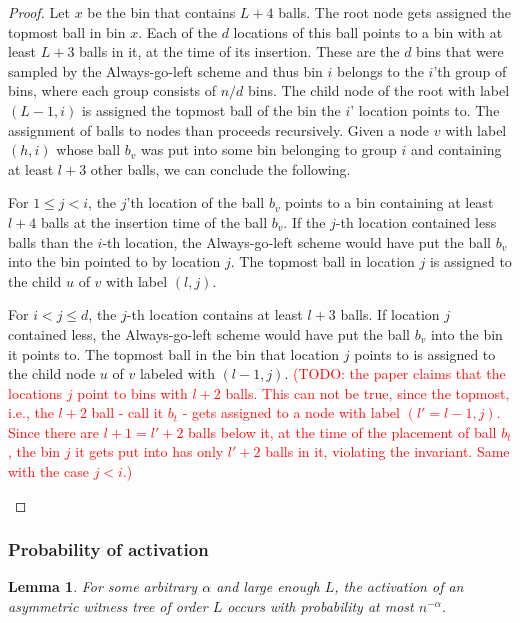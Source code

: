 \documentclass[a4paper,12pt]{article}
\newcommand\todo[1]{\textcolor{red}{(TODO: #1)}}
\newtheorem{lemma}{Lemma}
\begin{document}
\begin{proof}
Let $x$ be the bin that contains $L+4$ balls. The root node gets assigned the topmost ball in bin $x$. Each of the $d$ locations of this ball points to a bin with at least $L+3$ balls in it, at the time of its insertion. These are the $d$ bins that were sampled by the Always-go-left scheme and thus bin $i$ belongs to the $i$'th group of bins, where each group consists of $n/d$ bins. The child node of the root with label $(L-1, i)$ is assigned the topmost ball of the bin the $i$' location points to. The assignment of balls to nodes than proceeds recursively. Given a node $v$ with label $(h, i)$ whose ball $b_v$ was put into some bin belonging to group $i$ and containing at least $l+3$ other balls, we can conclude the following.
\begin{compactitem}
\item For $1\leq j < i$, the $j$'th location of the ball $b_v$ points to a bin containing at least $l+4$ balls at the insertion time of the ball $b_v$. If the $j$-th location contained less balls than the $i$-th location, the Always-go-left scheme would have put the ball $b_v$ into the bin pointed to by location $j$. The topmost ball in location $j$ is assigned to the  child $u$ of $v$ with label $(l,j)$. 
\item For $i < j \leq d$, the $j$-th location contains at least $l+3$ balls. If location $j$ contained less, the Always-go-left scheme would have put the ball $b_v$ into the bin it points to. The topmost ball in the bin that location $j$ points to is assigned to the child node $u$ of $v$ labeled with $(l-1, j)$. \todo{the paper claims that the locations $j$ point to bins with $l+2$ balls. This can not be true, since the topmost, i.e., the $l+2$ ball - call it $b_t$ - gets assigned to a node with label $(l'=l-1, j)$. Since there are $l+1=l'+2$ balls below it, at the time of the placement of ball $b_t$, the bin $j$ it gets put into has only $l'+2$ balls in it, violating the invariant. Same with the case $j<i$.} 
\end{compactitem}
\end{proof}

\subsubsection{Probability of activation}
\label{sec:analysis:probabilityAsymWT}
\begin{lemma}\label{lemma:awt:activation}
For some arbitrary $\alpha$ and large enough $L$, the activation of an asymmetric witness tree of order $L$ occurs with probability at most $n^{-\alpha}$.
\end{lemma}
\end{document}
